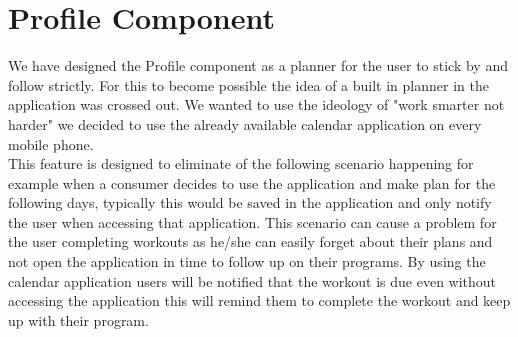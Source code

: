 \documentclass[a4paper,12pt]{report}
\begin{document}
\section{Profile Component}
We have designed the Profile component as a planner for the user to stick by and follow strictly.
For this to become possible the idea of a built in planner in the application was crossed out.
We wanted to use the ideology of "work smarter not harder" we decided to use the already available calendar application on every mobile phone.\\
This feature is designed to eliminate of the following scenario happening for example when a consumer decides to use the application and make plan for the following days, typically this would be saved in the application and only notify the user when accessing that application. This scenario can cause a problem for the user completing workouts as he/she can easily forget about their plans and not open the application in time to follow up on their programs.
By using the calendar application users will be notified that the workout is due even without accessing the application this will remind them to complete the workout and keep up with their program.
\end{document}
